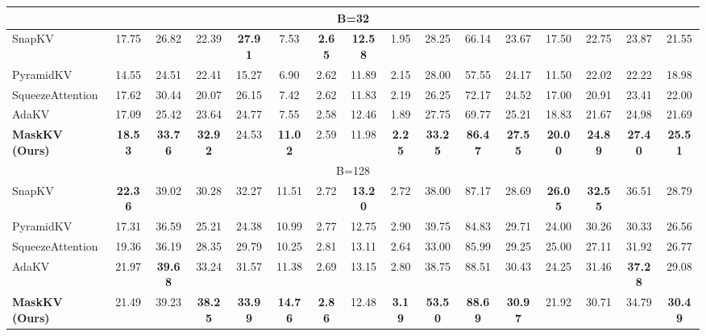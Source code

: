\begin{table*}[t!]
{\begin{tabular}{@{}l*{15}{c}@{}}
        \midrule
        \multicolumn{16}{c}{\small B=32} \\
        \midrule
        SnapKV & 17.75 & 26.82 & 22.39 & \textbf{27.91} & 7.53 & \textbf{2.65} & \textbf{12.58} & 1.95 & 28.25 & 66.14 & 23.67 & 17.50 & 22.75 & 23.87 & 21.55 \\
        PyramidKV & 14.55 & 24.51 & 22.41 & 15.27 & 6.90 & 2.62 & 11.89 & 2.15 & 28.00 & 57.55 & 24.17 & 11.50 & 22.02 & 22.22 & 18.98 \\
        SqueezeAttention & 17.62 & 30.44 & 20.07 & 26.15 & 7.42 & 2.62 & 11.83 & 2.19 & 26.25 & 72.17 & 24.52 & 17.00 & 20.91 & 23.41 & 22.00 \\
        AdaKV & 17.09 & 25.42 & 23.64 & 24.77 & 7.55 & 2.58 & 12.46 & 1.89 & 27.75 & 69.77 & 25.21 & 18.83 & 21.67 & 24.98 & 21.69 \\
        \rowcolor{lightgreen} \textbf{MaskKV (Ours)} & \textbf{18.53} & \textbf{33.76} & \textbf{32.92} & 24.53 & \textbf{11.02} & 2.59 & 11.98 & \textbf{2.25} & \textbf{33.25} & \textbf{86.47} & \textbf{27.55} & \textbf{20.00} & \textbf{24.89} & \textbf{27.40} & \textbf{25.51} \\
        \midrule
        \multicolumn{16}{c}{\small B=128} \\
        \midrule
        SnapKV & \textbf{22.36} & 39.02 & 30.28 & 32.27 & 11.51 & 2.72 & \textbf{13.20} & 2.72 & 38.00 & 87.17 & 28.69 & \textbf{26.05} & \textbf{32.55} & 36.51 & 28.79 \\
        PyramidKV & 17.31 & 36.59 & 25.21 & 24.38 & 10.99 & 2.77 & 12.75 & 2.90 & 39.75 & 84.83 & 29.71 & 24.00 & 30.26 & 30.33 & 26.56 \\
        SqueezeAttention & 19.36 & 36.19 & 28.35 & 29.79 & 10.25 & 2.81 & 13.11 & 2.64 & 33.00 & 85.99 & 29.25 & 25.00 & 27.11 & 31.92 & 26.77 \\
        AdaKV & 21.97 & \textbf{39.68} & 33.24 & 31.57 & 11.38 & 2.69 & 13.15 & 2.80 & 38.75 & 88.51 & 30.43 & 24.25 & 31.46 & \textbf{37.28} & 29.08 \\
        \rowcolor{lightgreen} \textbf{MaskKV (Ours)} & 21.49 & 39.23 & \textbf{38.25} & \textbf{33.99} & \textbf{14.76} & \textbf{2.86} & 12.48 & \textbf{3.19} & \textbf{53.50} & \textbf{88.69} & \textbf{30.97} & 21.92 & 30.71 & 34.79 & \textbf{30.49} \\
        \bottomrule
    \end{tabular}
    } 
\end{table*}